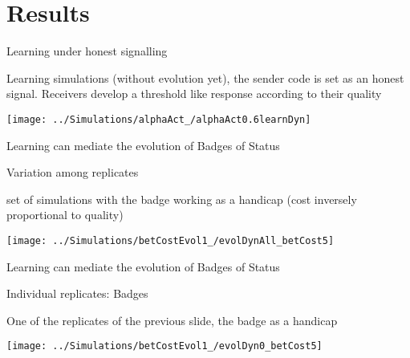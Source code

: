 \documentclass[
  ignorenonframetext,
]{beamer}
\begin{document}
\hypertarget{results}{%
\section{Results}\label{results}}

\begin{frame}{Learning under honest signalling}
\protect\hypertarget{learning-under-honest-signalling}{}

Learning simulations (without evolution yet), the sender code is set as
an honest signal. Receivers develop a threshold like response according
to their quality

\begin{center}\texttt{[image: ../Simulations/alphaAct\_/alphaAct0.6learnDyn]} \end{center}

\end{frame}

\begin{frame}{Learning can mediate the evolution of Badges of Status}
\protect\hypertarget{learning-can-mediate-the-evolution-of-badges-of-status}{}

\begin{block}{Variation among replicates}

\small

set of simulations with the badge working as a handicap (cost inversely
proportional to quality)

\begin{center}\texttt{[image: ../Simulations/betCostEvol1\_/evolDynAll\_betCost5]} \end{center}

\end{block}

\end{frame}

\begin{frame}{Learning can mediate the evolution of Badges of Status}
\protect\hypertarget{learning-can-mediate-the-evolution-of-badges-of-status-1}{}

\begin{block}{Individual replicates: Badges}

\small

One of the replicates of the previous slide, the badge as a handicap

\begin{center}\texttt{[image: ../Simulations/betCostEvol1\_/evolDyn0\_betCost5]} \end{center}

\end{block}

\end{frame}
\end{document}
